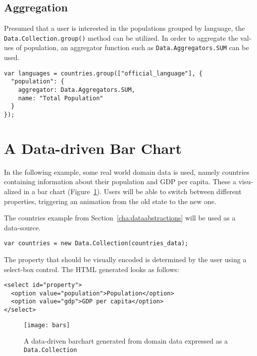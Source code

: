 \begin{english}
\subsection{Aggregation}

Presumed that a user is interested in the populations grouped by language, the \texttt{Data.Collection.group()} method can be utilized. In order to aggregate the values of population, an aggregator function such as \texttt{Data.Aggregators.SUM} can be used.

\begin{verbatim}
var languages = countries.group(["official_language"], {
  "population": {
    aggregator: Data.Aggregators.SUM, 
    name: "Total Population"
  }
});
\end{verbatim}

\section{A Data-driven Bar Chart}

In the following example, some real world domain data is used, namely countries containing information about their population and GDP per capita. These a visualized in a bar chart (Figure~\ref{fig:bars}). Users will be able to switch between different properties, triggering an animation from the old state to the new one. 

\SuperPar The countries example from Section~\ref{cha:dataabstractions} will be used as a data-source.

\begin{verbatim}
var countries = new Data.Collection(countries_data);
\end{verbatim}

\SuperPar The property that should be visually encoded is determined by the user using a select-box control. The HTML generated looks as follows:

\begin{verbatim}
<select id="property">
  <option value="population">Population</option>
  <option value="gdp">GDP per capita</option>
</select>
\end{verbatim}

\begin{figure}
\centering
\texttt{[image: bars]}
\caption{A data-driven barchart generated from domain data expressed as a \texttt{Data.Collection}}
\label{fig:bars}
\end{figure}


\end{english}
